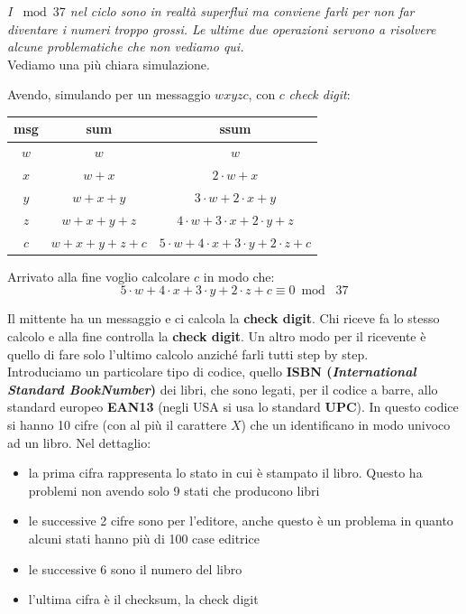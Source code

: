 \documentclass[a4paper,12pt, oneside]{book}
\begin{document}
\textit{I $\bmod 37$ nel ciclo sono in realtà superflui ma conviene farli per
  non far diventare i numeri troppo grossi. Le ultime due operazioni servono a
  risolvere alcune problematiche che non vediamo qui.}\\
Vediamo una più chiara simulazione.
\begin{esempio}
  Avendo, simulando per un messaggio $wxyzc$, con $c$ \textit{check digit}:
  \begin{table}[H]
    \centering
    \begin{tabular}{|c|c|c|}
      \hline
      msg & sum & ssum \\
      \hline
      $w$ & $w$ & $w$ \\
      $x$ & $w+x$ & $2\cdot w+x$ \\
      $y$ & $w+x+y$ & $3\cdot w+2\cdot x+y$ \\
      $z$ & $w+x+y+z$ & $4\cdot w+ 3\cdot x+2\cdot y+z$ \\
      \hline
      $c$ & $w+x+y+z+c$ & $5\cdot w+4\cdot x+3\cdot y+2\cdot z+c$ \\
      \hline
    \end{tabular}
  \end{table}
  Arrivato alla fine voglio calcolare $c$ in modo che:
  \[5\cdot w+4\cdot x+3\cdot y+2\cdot z+c \equiv 0 \bmod\,\, 37\]
\end{esempio}
Il mittente ha un messaggio e ci calcola la \textbf{check digit}.
Chi riceve fa lo stesso calcolo e alla fine controlla la \textbf{check
  digit}. Un altro modo per il ricevente è quello di fare solo l'ultimo calcolo
anziché farli tutti step by step.\\
Introduciamo un particolare tipo di codice, quello \textbf{ISBN
  (\textit{International Standard BookNumber})} dei libri, che 
sono legati, per il codice a barre, allo standard europeo \textbf{EAN13} (negli
USA si usa lo standard 
\textbf{UPC}). In questo codice si hanno 10 cifre (con al più il carattere $X$)
che un identificano in modo univoco ad un libro. Nel dettaglio:
\begin{itemize}
  \item la prima cifra rappresenta lo stato in cui è stampato il libro. Questo
  ha problemi non avendo solo 9 stati che producono libri
  \item le successive 2 cifre sono per l'editore, anche questo è un
  problema in quanto alcuni stati hanno più di 100 case editrice
  \item le successive 6 sono il numero del libro
  \item l'ultima cifra è il checksum, la check digit
\end{itemize}
\end{document}
